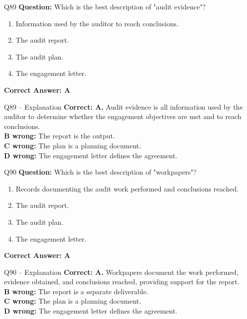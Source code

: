 \documentclass[aspectratio=169,10pt]{beamer}
\begin{document}
	\begin{frame}[t]{Q89}
		\small
		\textbf{Question:} Which is the best description of "audit evidence"?
		\begin{enumerate}[label=\Alph*.,itemsep=1pt,topsep=2pt]
			\item Information used by the auditor to reach conclusions.
			\item The audit report.
			\item The audit plan.
			\item The engagement letter.
		\end{enumerate}
		\vspace{4pt}
		\textbf{Correct Answer: A}
	\end{frame}
	
	\begin{frame}[t]{Q89 -- Explanation}
		\small
		\textbf{Correct: A.} Audit evidence is all information used by the auditor to determine whether the engagement objectives are met and to reach conclusions. \\[4pt]
		\textbf{B wrong:} The report is the output. \\[2pt]
		\textbf{C wrong:} The plan is a planning document. \\[2pt]
		\textbf{D wrong:} The engagement letter defines the agreement.
	\end{frame}
	
	\begin{frame}[t]{Q90}
		\small
		\textbf{Question:} Which is the best description of "workpapers"?
		\begin{enumerate}[label=\Alph*.,itemsep=1pt,topsep=2pt]
			\item Records documenting the audit work performed and conclusions reached.
			\item The audit report.
			\item The audit plan.
			\item The engagement letter.
		\end{enumerate}
		\vspace{4pt}
		\textbf{Correct Answer: A}
	\end{frame}
	
	\begin{frame}[t]{Q90 -- Explanation}
		\small
		\textbf{Correct: A.} Workpapers document the work performed, evidence obtained, and conclusions reached, providing support for the report. \\[4pt]
		\textbf{B wrong:} The report is a separate deliverable. \\[2pt]
		\textbf{C wrong:} The plan is a planning document. \\[2pt]
		\textbf{D wrong:} The engagement letter defines the agreement.
	\end{frame}
	
\end{document}
